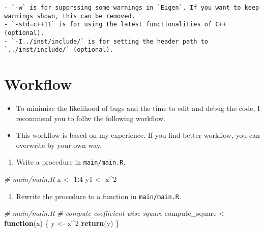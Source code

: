 \documentclass[
]{book}
\newenvironment{Shaded}{\begin{snugshade}}{\end{snugshade}}
\newcommand{\CommentTok}[1]{\textcolor[rgb]{0.56,0.35,0.01}{\textit{#1}}}
\newcommand{\ControlFlowTok}[1]{\textcolor[rgb]{0.13,0.29,0.53}{\textbf{#1}}}
\newcommand{\DecValTok}[1]{\textcolor[rgb]{0.00,0.00,0.81}{#1}}
\newcommand{\KeywordTok}[1]{\textcolor[rgb]{0.13,0.29,0.53}{\textbf{#1}}}
\newcommand{\NormalTok}[1]{#1}
\newcommand{\OperatorTok}[1]{\textcolor[rgb]{0.81,0.36,0.00}{\textbf{#1}}}
\newcommand{\StringTok}[1]{\textcolor[rgb]{0.31,0.60,0.02}{#1}}
\providecommand{\tightlist}{%
  \setlength{\itemsep}{0pt}\setlength{\parskip}{0pt}}
\begin{document}
\begin{verbatim}
- `-w` is for supprssing some warnings in `Eigen`. If you want to keep warnings shown, this can be removed.
- `-std=c++11` is for using the latest functionalities of C++ (optional).
- `-I../inst/include/` is for setting the header path to `../inst/include/` (optional).
\end{verbatim}

\hypertarget{workflow}{%
\section{Workflow}\label{workflow}}

\begin{itemize}
\tightlist
\item
  To minimize the likelihood of bugs and the time to edit and debug the code, I recommend you to follw the following workflow.
\item
  This workflow is based on my experience. If you find better workflow, you can overwrite by your own way.
\end{itemize}

\begin{enumerate}
\def\labelenumi{\arabic{enumi}.}
\tightlist
\item
  Write a procedure in \texttt{main/main.R}.
\end{enumerate}

\begin{Shaded}
\begin{Highlighting}[]
\CommentTok{# main/main.R}
\NormalTok{x <-}\StringTok{ }\DecValTok{1}\OperatorTok{:}\DecValTok{4}
\NormalTok{y1 <-}\StringTok{ }\NormalTok{x}\OperatorTok{^}\DecValTok{2}
\end{Highlighting}
\end{Shaded}

\begin{enumerate}
\def\labelenumi{\arabic{enumi}.}
\setcounter{enumi}{1}
\tightlist
\item
  Rewrite the procedure to a function in \texttt{main/main.R}.
\end{enumerate}

\begin{Shaded}
\begin{Highlighting}[]
\CommentTok{# main/main.R}
\CommentTok{# compute coefficient-wise square}
\NormalTok{compute_square <-}
\StringTok{  }\ControlFlowTok{function}\NormalTok{(x) \{}
\NormalTok{    y <-}\StringTok{ }\NormalTok{x}\OperatorTok{^}\DecValTok{2}
    \KeywordTok{return}\NormalTok{(y)}
\NormalTok{  \}}
\end{Highlighting}
\end{Shaded}
\end{document}
